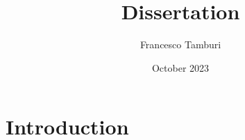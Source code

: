 \documentclass{report}
\title{Dissertation}
\author{Francesco Tamburi}
\date{October 2023}
\begin{document}
\maketitle

\listoftodos

\chapter*{Introduction}


\end{document}
